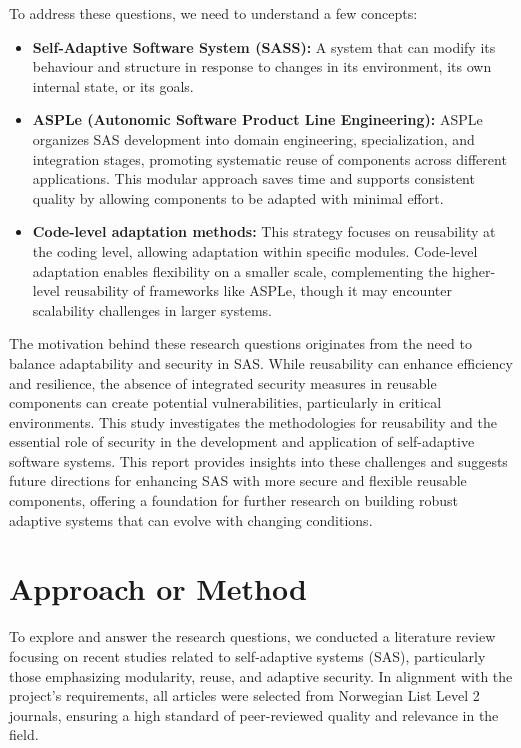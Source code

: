\documentclass[a4paper,10pt]{article}
\begin{document}
To address these questions, we need to understand a few concepts:

\begin{itemize}
    \item \textbf{Self-Adaptive Software System (SASS):} A system that can modify its behaviour and structure in response to changes in its environment, its own internal state, or its goals.
    
    \item \textbf{ASPLe (Autonomic Software Product Line Engineering):} ASPLe organizes SAS development into domain engineering, specialization, and integration stages, promoting systematic reuse of components across different applications. This modular approach saves time and supports consistent quality by allowing components to be adapted with minimal effort.
    
    \item \textbf{Code-level adaptation methods:} This strategy focuses on reusability at the coding level, allowing adaptation within specific modules. Code-level adaptation enables flexibility on a smaller scale, complementing the higher-level reusability of frameworks like ASPLe, though it may encounter scalability challenges in larger systems.
    
\end{itemize}

The motivation behind these research questions originates from the need to balance adaptability and security in SAS. While reusability can enhance efficiency and resilience, the absence of integrated security measures in reusable components can create potential vulnerabilities, particularly in critical environments. This study investigates the methodologies for reusability and the essential role of security in the development and application of self-adaptive software systems. This report provides insights into these challenges and suggests future directions for enhancing SAS with more secure and flexible reusable components, offering a foundation for further research on building robust adaptive systems that can evolve with changing conditions.
\section{Approach or Method}

To explore and answer the research questions, we conducted a literature review focusing on recent studies related to self-adaptive systems (SAS), particularly those emphasizing modularity, reuse, and adaptive security. In alignment with the project’s requirements, all articles were selected from Norwegian List Level 2 journals, ensuring a high standard of peer-reviewed quality and relevance in the field.
\end{document}
